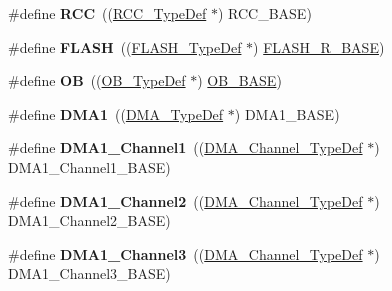 \begin{DoxyCompactItemize}
\item 
\hypertarget{group___peripheral__declaration_ga74944438a086975793d26ae48d5882d4}{\#define {\bfseries R\-C\-C}~((\hyperlink{struct_r_c_c___type_def}{R\-C\-C\-\_\-\-Type\-Def} $\ast$) R\-C\-C\-\_\-\-B\-A\-S\-E)}\label{group___peripheral__declaration_ga74944438a086975793d26ae48d5882d4}

\item 
\hypertarget{group___peripheral__declaration_ga844ea28ba1e0a5a0e497f16b61ea306b}{\#define {\bfseries F\-L\-A\-S\-H}~((\hyperlink{struct_f_l_a_s_h___type_def}{F\-L\-A\-S\-H\-\_\-\-Type\-Def} $\ast$) \hyperlink{group___peripheral__memory__map_ga8e21f4845015730c5731763169ec0e9b}{F\-L\-A\-S\-H\-\_\-\-R\-\_\-\-B\-A\-S\-E})}\label{group___peripheral__declaration_ga844ea28ba1e0a5a0e497f16b61ea306b}

\item 
\hypertarget{group___peripheral__declaration_gad2d5f875cdc6d696735f20fa23a895c3}{\#define {\bfseries O\-B}~((\hyperlink{struct_o_b___type_def}{O\-B\-\_\-\-Type\-Def} $\ast$) \hyperlink{group___peripheral__memory__map_gab5b5fb155f9ee15dfb6d757da1adc926}{O\-B\-\_\-\-B\-A\-S\-E})}\label{group___peripheral__declaration_gad2d5f875cdc6d696735f20fa23a895c3}

\item 
\hypertarget{group___peripheral__declaration_gacc16d2a5937f7585320a98f7f6b578f9}{\#define {\bfseries D\-M\-A1}~((\hyperlink{struct_d_m_a___type_def}{D\-M\-A\-\_\-\-Type\-Def} $\ast$) D\-M\-A1\-\_\-\-B\-A\-S\-E)}\label{group___peripheral__declaration_gacc16d2a5937f7585320a98f7f6b578f9}

\item 
\hypertarget{group___peripheral__declaration_gac83c5be824be1c02716e2522e80ddf7a}{\#define {\bfseries D\-M\-A1\-\_\-\-Channel1}~((\hyperlink{struct_d_m_a___channel___type_def}{D\-M\-A\-\_\-\-Channel\-\_\-\-Type\-Def} $\ast$) D\-M\-A1\-\_\-\-Channel1\-\_\-\-B\-A\-S\-E)}\label{group___peripheral__declaration_gac83c5be824be1c02716e2522e80ddf7a}

\item 
\hypertarget{group___peripheral__declaration_ga23d7631dd10c645e06971b2543ba2949}{\#define {\bfseries D\-M\-A1\-\_\-\-Channel2}~((\hyperlink{struct_d_m_a___channel___type_def}{D\-M\-A\-\_\-\-Channel\-\_\-\-Type\-Def} $\ast$) D\-M\-A1\-\_\-\-Channel2\-\_\-\-B\-A\-S\-E)}\label{group___peripheral__declaration_ga23d7631dd10c645e06971b2543ba2949}

\item 
\hypertarget{group___peripheral__declaration_gacf7b6093a37b306d7f1f50b2f200f0d0}{\#define {\bfseries D\-M\-A1\-\_\-\-Channel3}~((\hyperlink{struct_d_m_a___channel___type_def}{D\-M\-A\-\_\-\-Channel\-\_\-\-Type\-Def} $\ast$) D\-M\-A1\-\_\-\-Channel3\-\_\-\-B\-A\-S\-E)}\label{group___peripheral__declaration_gacf7b6093a37b306d7f1f50b2f200f0d0}


\end{DoxyCompactItemize}
